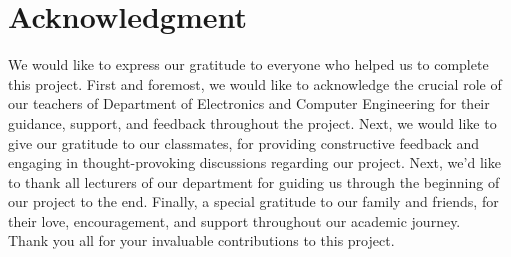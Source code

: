 








\KECcoverpage
\KECtitlepage

\KECapproval
\chapter*{Acknowledgment}
We would like to express our gratitude to everyone who helped us to complete this project.
First and foremost, we would like to acknowledge the crucial role of our teachers of Department of Electronics and Computer Engineering for their guidance, support, and feedback throughout the project. Next, we would like
to give our gratitude to our classmates, for providing constructive feedback and engaging in
thought-provoking discussions regarding our project. Next, we’d like to thank all lecturers
of our department for guiding us through the beginning of our project to the end. Finally,
a special gratitude to our family and friends, for their love, encouragement, and support
throughout our academic journey.\\
Thank you all for your invaluable contributions to this project.\\
\\
\\
\\
